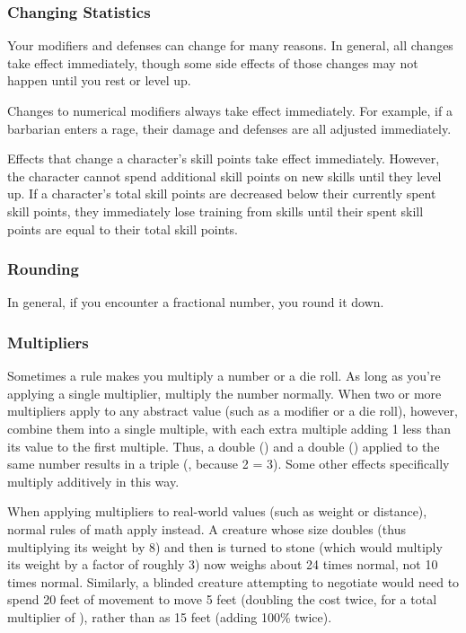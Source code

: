        \subsubsection{Changing Statistics}

            Your modifiers and defenses can change for many reasons.
            In general, all changes take effect immediately, though some side effects of those changes may not happen until you rest or level up.

             Changes to numerical modifiers always take effect immediately.
            For example, if a barbarian enters a rage, their damage and defenses are all adjusted immediately.

             Effects that change a character's skill points take effect immediately.
            However, the character cannot spend additional skill points on new skills until they level up.
            If a character's total skill points are decreased below their currently spent skill points, they immediately lose training from skills until their spent skill points are equal to their total skill points.

        \subsubsection{Rounding}
            In general, if you encounter a fractional number, you round it down.

        \subsubsection{Multipliers}
            Sometimes a rule makes you multiply a number or a die roll.
            As long as you're applying a single multiplier, multiply the number normally.
            When two or more multipliers apply to any abstract value (such as a modifier or a die roll), however, combine them into a single multiple, with each extra multiple adding 1 less than its value to the first multiple.
            Thus, a double () and a double () applied to the same number results in a triple (, because 2  = 3).
            Some other effects specifically multiply additively in this way.

            When applying multipliers to real-world values (such as weight or distance), normal rules of math apply instead.
            A creature whose size doubles (thus multiplying its weight by 8) and then is turned to stone (which would multiply its weight by a factor of roughly 3) now weighs about 24 times normal, not 10 times normal.
            Similarly, a blinded creature attempting to negotiate  would need to spend 20 feet of movement to move 5 feet (doubling the cost twice, for a total multiplier of ), rather than as 15 feet (adding 100\% twice).

